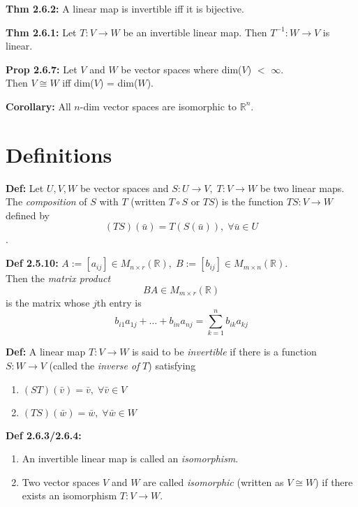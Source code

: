 \bigskip 

\noindent 
\textbf{Thm 2.6.2:} A linear map is invertible iff it is bijective. 

\bigskip 

\noindent 
\textbf{Thm 2.6.1:} Let $T: V \rightarrow W$ be an invertible linear map. Then $T^{-1}:W \rightarrow V$ is linear. 

\bigskip 

\noindent
\textbf{Prop 2.6.7:} Let $V$ and $W$ be vector spaces where dim($V$) $<$ $\infty$. \\ 
Then $V \cong W$ iff dim($V$) = dim($W$). 

\bigskip 

\noindent 
\textbf{Corollary:} All $n$-dim vector spaces are isomorphic to $\mathbb{R}^n$. 

\pagebreak

\section*{Definitions} 

\textbf{Def:} Let $U,V,W$ be vector spaces and $S: U \rightarrow V, \; T: V \rightarrow W$ be two linear maps. 
The \textit{composition} of $S$ with $T$ (written $T \circ S$ or $TS$) is the function $TS: V \rightarrow W$ defined by 
\[(TS)(\bar u) = T(S(\bar u)), \; \forall \bar u \in U\].

\noindent 
\textbf{Def 2.5.10:} $A := [a_{ij}] \in M_{n \times r}(\mathbb{R}), \; B := [b_{ij}] \in M_{m \times n}(\mathbb{R})$. \\
Then the \textit{matrix product} \\ 
\[BA \in M_{m \times r}(\mathbb{R})\]  
 is the matrix whose $j$th entry is 
\[b_{i1}a_{1j} + \ldots + b_{in}a_{nj} = \sum_{k = 1}^{n} b_{ik}a_{kj} \] 

\bigskip 

\noindent
\textbf{Def:} A linear map $T: V \rightarrow W$ is said to be \textit{invertible} if there is a function $S: W \rightarrow V$ (called the \textit{inverse of }$T$) satisfying 
\begin{enumerate}
    \item $(ST)(\bar v) = \bar v, \; \forall \bar v \in V$
    \item $(TS)(\bar w) = \bar w, \; \forall \bar w \in W$
\end{enumerate}

\bigskip 

\noindent 
\textbf{Def 2.6.3/2.6.4:} 
\begin{enumerate}
    \item An invertible linear map is called an \textit{isomorphism}. 
    \item Two vector spaces $V$ and $W$ are called \textit{isomorphic} (written as $V \cong W$) if there exists an isomorphism $T: V \rightarrow W$.
\end{enumerate}